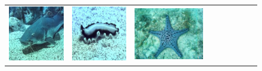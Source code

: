 \begin{figure}[ht]
\begin{center}
\begin{tabular}{ccccccccc}
            \includegraphics[width = 0.10\linewidth, height=0.10\linewidth]{figures/ch3/compare/discussion/SOD/original/6.jpg}  & \hspace{-0.43cm}
            \includegraphics[width = 0.10\linewidth, height=0.10\linewidth]{figures/ch3/compare/discussion/SOD/original/7.JPEG}  & \hspace{-0.43cm}
            \includegraphics[width = 0.10\linewidth, height=0.10\linewidth]{figures/ch3/compare/discussion/SOD/original/9.jpg} \\
            

\end{tabular}
\end{center}
\end{figure}
